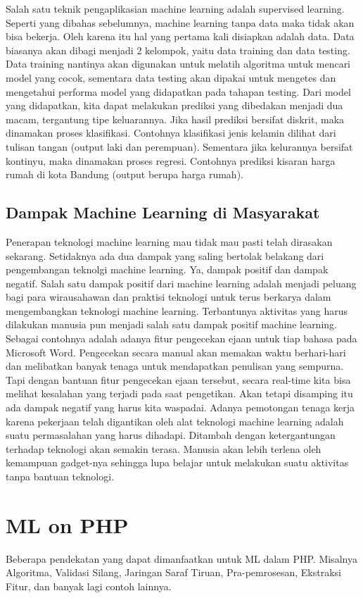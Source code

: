 Salah satu teknik pengaplikasian machine learning adalah supervised learning. Seperti yang dibahas sebelumnya, machine learning tanpa data maka tidak akan bisa bekerja. Oleh karena itu hal yang pertama kali disiapkan adalah data. Data biasanya akan dibagi menjadi 2 kelompok, yaitu data training dan data testing. Data training nantinya akan digunakan untuk melatih algoritma untuk mencari model yang cocok, sementara data testing akan dipakai untuk mengetes dan mengetahui performa model yang didapatkan pada tahapan testing.
Dari model yang didapatkan, kita dapat melakukan prediksi yang dibedakan menjadi dua macam, tergantung tipe keluarannya. Jika hasil prediksi bersifat diskrit, maka dinamakan proses klasifikasi. Contohnya klasifikasi jenis kelamin dilihat dari tulisan tangan (output laki dan perempuan). Sementara jika kelurannya bersifat kontinyu, maka dinamakan proses regresi. Contohnya prediksi kisaran harga rumah di kota Bandung (output berupa harga rumah).

\subsection{Dampak Machine Learning di Masyarakat}
Penerapan teknologi machine learning mau tidak mau pasti telah dirasakan sekarang. Setidaknya ada dua dampak yang saling bertolak belakang dari pengembangan teknolgi machine learning. Ya, dampak positif dan dampak negatif.
Salah satu dampak positif dari machine learning adalah menjadi peluang bagi para wirausahawan dan praktisi teknologi untuk terus berkarya dalam mengembangkan teknologi machine learning. Terbantunya aktivitas yang harus dilakukan manusia pun menjadi salah satu dampak positif machine learning. Sebagai contohnya adalah adanya fitur pengecekan ejaan untuk tiap bahasa pada Microsoft Word. Pengecekan secara manual akan memakan waktu berhari-hari dan melibatkan banyak tenaga untuk mendapatkan penulisan yang sempurna. Tapi dengan bantuan fitur pengecekan ejaan tersebut, secara real-time kita bisa melihat kesalahan yang terjadi pada saat pengetikan.
Akan tetapi disamping itu ada dampak negatif yang harus kita waspadai. Adanya pemotongan tenaga kerja karena pekerjaan telah digantikan oleh alat teknologi machine learning adalah suatu permasalahan yang harus dihadapi. Ditambah dengan ketergantungan terhadap teknologi akan semakin terasa. Manusia akan lebih terlena oleh kemampuan gadget-nya sehingga lupa belajar untuk melakukan suatu aktivitas tanpa bantuan teknologi.

\section{ML on PHP}
Beberapa pendekatan yang dapat dimanfaatkan  untuk ML dalam PHP. Misalnya Algoritma, Validasi Silang, Jaringan Saraf Tiruan, Pra-pemrosesan, Ekstraksi Fitur, dan banyak lagi contoh lainnya.


